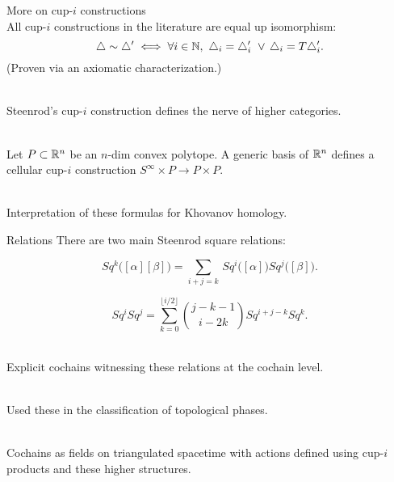 \begin{frame}{More on cup-$i$ constructions}
	\pause
	 \\
	All cup-$i$ constructions in the literature are equal up isomorphism:
	\[
	\triangle \sim \triangle^\prime \iff \forall i \in \mathbb{N}, \ \triangle_i = \triangle_i^\prime \ \vee \, \triangle_i = T \triangle_i^\prime.
	\]
	(Proven via an axiomatic characterization.)

	\bigskip\pause
	 \\
	Steenrod's cup-$i$ construction defines the nerve of higher categories.

	\bigskip\pause
	 \\
	Let $P \subset \mathbb{R}^n$ be an $n$-dim convex polytope.
	A generic basis of $\mathbb{R}^n$ defines a cellular cup-$i$ construction $S^\infty \times P \to P \times P$.

	\bigskip\pause
	 \\
	Interpretation of these formulas for Khovanov homology.
\end{frame}

\begin{frame}{Relations}
	\pause
	There are two main Steenrod square relations:

	\bigskip\pause
	\vspace*{-5pt}
	\begin{equation*}
		Sq^k \big( [\alpha] [\beta] \big) =
		\sum_{i+j=k} \, Sq^i\big([\alpha]\big) Sq^j\big([\beta]\big).
	\end{equation*}

	\pause
	\vspace*{-5pt}
	\begin{equation*}
		Sq^i Sq^j =
		\sum_{k=0}^{\lfloor i/2 \rfloor} \binom{j-k-1}{i-2k} Sq^{i+j-k} Sq^k.
	\end{equation*}

	\medskip\pause
	 \\
	Explicit cochains witnessing these relations at the cochain level.

	\medskip\pause
	 \\
	Used these in the classification of topological phases.

	\medskip\pause
	 \\
	Cochains as fields on triangulated spacetime with actions defined using cup-$i$ products and these higher structures.
\end{frame}